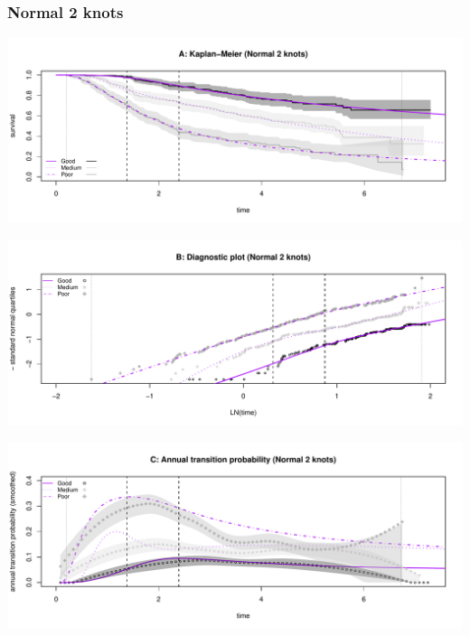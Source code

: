 \documentclass[
]{article}
\begin{document}
\clearpage

\subsubsection{Normal 2 knots}\label{normal-2-knots}

\begin{flushleft}\includegraphics[height=0.25\textheight]{BC_OS_output/Images/Figure_spline_models-22} \end{flushleft}

\begin{flushleft}\includegraphics[height=0.25\textheight]{BC_OS_output/Images/Figure_spline_models-23} \end{flushleft}

\begin{flushleft}\includegraphics[height=0.25\textheight]{BC_OS_output/Images/Figure_spline_models-24} \end{flushleft}
\end{document}
